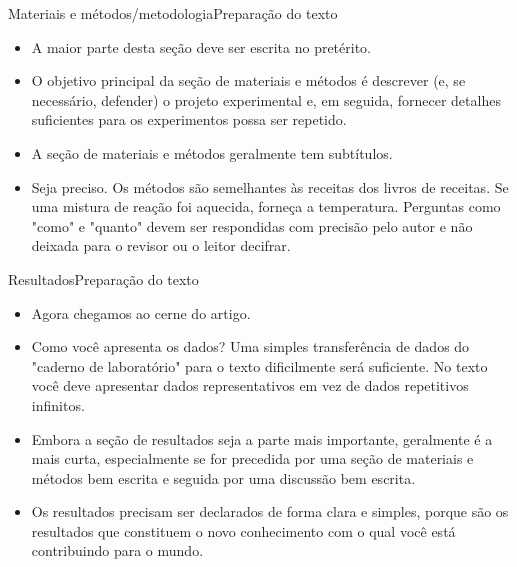\documentclass[t]{beamer}
\begin{document}
\begin{ftst}{Materiais e métodos/metodologia}{Preparação do texto}
\justifying
\begin{itemize}
    \item A maior parte desta seção deve ser escrita no pretérito.
    \vone
    \item O objetivo principal da seção de materiais e métodos é descrever (e, se necessário, defender) o projeto experimental e, em seguida, fornecer detalhes suficientes para os experimentos possa ser repetido.
    \vone
    \item A seção de materiais e métodos geralmente tem subtítulos.
    \vone
    \item Seja preciso. Os métodos são semelhantes às receitas dos livros de receitas. Se uma mistura de reação foi aquecida, forneça a temperatura. Perguntas como "como" e "quanto" devem ser respondidas com precisão pelo autor e não deixada para o revisor ou o leitor decifrar.
\end{itemize}

\end{ftst}


\begin{ftst}{Resultados}{Preparação do texto}
\justifying
\begin{itemize}
    \item Agora chegamos ao cerne do artigo.
    \vone
    \item Como você apresenta os dados? Uma simples transferência de dados do "caderno de laboratório" para o texto dificilmente será suficiente. No texto você deve apresentar dados representativos em vez de dados repetitivos infinitos.
    \vone
    \item Embora a seção de resultados seja a parte mais importante, geralmente é a mais curta, especialmente se for precedida por uma seção de materiais e métodos bem escrita e seguida por uma discussão bem escrita.
    \vone
    \item Os resultados precisam ser declarados de forma clara e simples, porque são os resultados que constituem o novo conhecimento com o qual você está contribuindo para o mundo.
\end{itemize}

\end{ftst}

\end{document}
